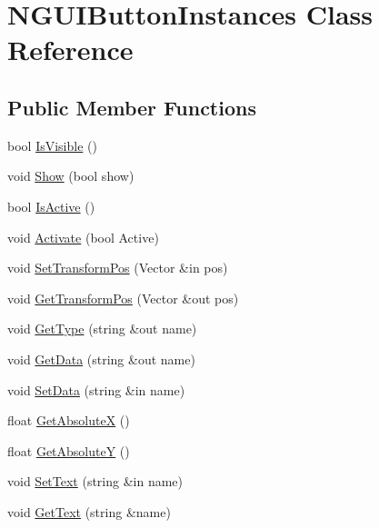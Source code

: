 \hypertarget{class_n_g_u_i_button_instances}{}\section{N\+G\+U\+I\+Button\+Instances Class Reference}
\label{class_n_g_u_i_button_instances}
\subsection*{Public Member Functions}
\begin{DoxyCompactItemize}
\item 
bool \hyperlink{class_n_g_u_i_button_instances_a89aa8de0b508b3a4087b6309757b9b95}{Is\+Visible} ()
\item 
void \hyperlink{class_n_g_u_i_button_instances_aae751479e9376853d489a50a4bc2186c}{Show} (bool show)
\item 
bool \hyperlink{class_n_g_u_i_button_instances_a507001ddb5e20bac93a02f07ff50b3c6}{Is\+Active} ()
\item 
void \hyperlink{class_n_g_u_i_button_instances_a5dcb1fe9f38f1efa2418cca59250cbf0}{Activate} (bool Active)
\item 
void \hyperlink{class_n_g_u_i_button_instances_a34c1a2c7f07f6fc2d596745f62f32d7c}{Set\+Transform\+Pos} (Vector \&in pos)
\item 
void \hyperlink{class_n_g_u_i_button_instances_aee7c275af20d11e04f6241727b6d2e30}{Get\+Transform\+Pos} (Vector \&out pos)
\item 
void \hyperlink{class_n_g_u_i_button_instances_a6df16d199a09d4f28e3529c79d1c64da}{Get\+Type} (string \&out name)
\item 
void \hyperlink{class_n_g_u_i_button_instances_a01c5f4f44507d5c85b0a6153c4edf674}{Get\+Data} (string \&out name)
\item 
void \hyperlink{class_n_g_u_i_button_instances_a522bcd2ab6a2836e78011e1facdf7600}{Set\+Data} (string \&in name)
\item 
float \hyperlink{class_n_g_u_i_button_instances_aa6e67fb2e7e70268e5b52a3889f6d5c8}{Get\+AbsoluteX} ()
\item 
float \hyperlink{class_n_g_u_i_button_instances_a22ddb71f24accdb17ef19bb32d56e3b4}{Get\+AbsoluteY} ()
\item 
void \hyperlink{class_n_g_u_i_button_instances_af2efec3abac4dab2d8021a1288b4c5eb}{Set\+Text} (string \&in name)
\item 
void \hyperlink{class_n_g_u_i_button_instances_aef01520907a809d25171ea93ce9ab285}{Get\+Text} (string \&name)

\end{DoxyCompactItemize}
